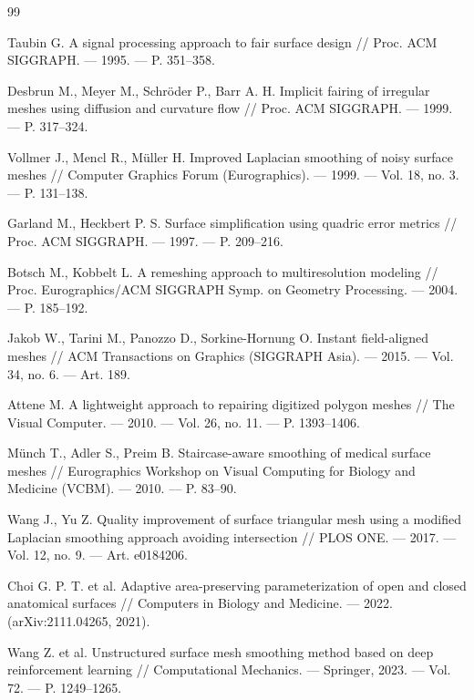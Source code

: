 \documentclass[a4paper,14pt]{article}
\begin{document}
\renewcommand{\refname}{Список литературы}
\begin{thebibliography}{99}

 Taubin G. A signal processing approach to fair surface design // Proc. ACM SIGGRAPH. --- 1995. --- P. 351--358.

 Desbrun M., Meyer M., Schr\"oder P., Barr A. H. Implicit fairing of irregular meshes using diffusion and curvature flow // Proc. ACM SIGGRAPH. --- 1999. --- P. 317--324.

 Vollmer J., Mencl R., M\"uller H. Improved Laplacian smoothing of noisy surface meshes // Computer Graphics Forum (Eurographics). --- 1999. --- Vol. 18, no. 3. --- P. 131--138.

 Garland M., Heckbert P. S. Surface simplification using quadric error metrics // Proc. ACM SIGGRAPH. --- 1997. --- P. 209--216.

 Botsch M., Kobbelt L. A remeshing approach to multiresolution modeling // Proc. Eurographics/ACM SIGGRAPH Symp. on Geometry Processing. --- 2004. --- P. 185--192.

 Jakob W., Tarini M., Panozzo D., Sorkine-Hornung O. Instant field-aligned meshes // ACM Transactions on Graphics (SIGGRAPH Asia). --- 2015. --- Vol. 34, no. 6. --- Art. 189.

 Attene M. A lightweight approach to repairing digitized polygon meshes // The Visual Computer. --- 2010. --- Vol. 26, no. 11. --- P. 1393--1406.

 M\"unch T., Adler S., Preim B. Staircase-aware smoothing of medical surface meshes // Eurographics Workshop on Visual Computing for Biology and Medicine (VCBM). --- 2010. --- P. 83--90.

 Wang J., Yu Z. Quality improvement of surface triangular mesh using a modified Laplacian smoothing approach avoiding intersection // PLOS ONE. --- 2017. --- Vol. 12, no. 9. --- Art. e0184206.

 Choi G. P. T. et al. Adaptive area-preserving parameterization of open and closed anatomical surfaces // Computers in Biology and Medicine. --- 2022. (arXiv:2111.04265, 2021).

 Wang Z. et al. Unstructured surface mesh smoothing method based on deep reinforcement learning // Computational Mechanics. --- Springer, 2023. --- Vol. 72. --- P. 1249--1265.


\end{thebibliography}
\end{document}
